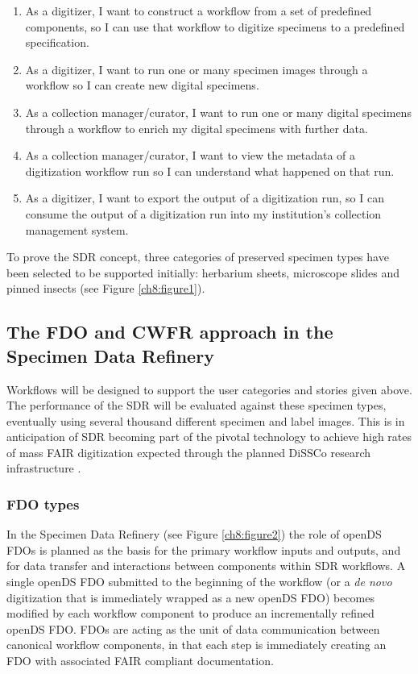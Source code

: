 \begin{enumerate}
\item
  As a digitizer, I want to construct a workflow from a set of
  predefined components, so I can use that workflow to digitize
  specimens to a predefined specification.
\item
  As a digitizer, I want to run one or many specimen images through a
  workflow so I can create new digital specimens.
\item
  As a collection manager/curator, I want to run one or many digital
  specimens through a workflow to enrich my digital specimens with
  further data.
\item
  As a collection manager/curator, I want to view the metadata of a
  digitization workflow run so I can understand what happened on that
  run.
\item
  As a digitizer, I want to export the output of a digitization run, so
  I can consume the output of a digitization run into my institution's
  collection management system.
\end{enumerate}

To prove the SDR concept, three categories of preserved specimen types
have been selected to be supported initially: herbarium sheets,
microscope slides and pinned insects (see Figure \vref{ch8:figure1}).

\subsection{The FDO and CWFR approach in the Specimen Data Refinery}\label{the-fdo-and-cwfr-approach-in-the-specimen-data-refinery}

Workflows will be designed to support the user categories and stories
given above. The performance of the SDR will be evaluated against these
specimen types, eventually using several thousand different specimen and
label images. This is in anticipation of SDR becoming part of the
pivotal technology to achieve high rates of mass FAIR digitization
expected through the planned DiSSCo research infrastructure \cite{Lannom 2020,Addink 2019,Hardisty 2020}.

\subsubsection{FDO types}\label{ch8:fdo-types}

In the Specimen Data Refinery (see Figure \vref{ch8:figure2}) the role of openDS FDOs is
planned as the basis for the primary workflow inputs and outputs, and
for data transfer and interactions between components within SDR
workflows. A single openDS FDO submitted to the beginning of the
workflow (or a \emph{de novo} digitization that is immediately wrapped
as a new openDS FDO) becomes modified by each workflow component to
produce an incrementally refined openDS FDO. FDOs are acting as the unit
of data communication between canonical workflow components, in that
each step is immediately creating an FDO with associated FAIR compliant
documentation.

